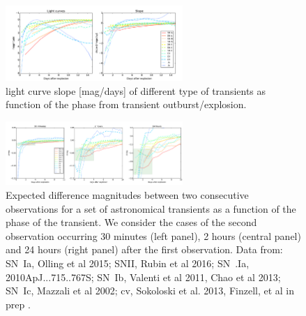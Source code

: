 \begin{figure}[hbt]
\centerline{
\includegraphics[width=0.6\textwidth]{figs/transients/earlyslope.pdf}
}
\caption{light curve slope [mag/days] of different type of transients as function of the phase from transient outburst/explosion.}
\label{fig:earlyslope}
\end{figure}

\begin{figure}[hbt]
\centerline{
\includegraphics[width=0.6\textwidth]{figs/transients/earlyrise.pdf}
}
\caption{Expected difference magnitudes between two consecutive observations for a set of astronomical transients as a function of the phase of the transient. We consider the cases of the second observation occurring 30 minutes (left panel), 2 hours (central panel) and 24 hours (right panel) after the first observation. Data from: SN~Ia,  Olling et al 2015; SNII, Rubin et al 2016; SN~.Ia, 2010ApJ...715..767S; SN~Ib, Valenti et al 2011, Chao et al 2013; SN~Ic, Mazzali et al 2002; cv, Sokoloski et al. 2013, Finzell, et al in prep .
}
\label{fig:earlyrise}
\end{figure}
%

